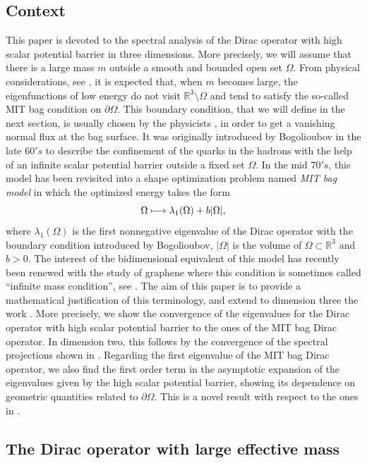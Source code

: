 \documentclass[10pt]{amsart}
\newcommand\mto{\mathchoice{\longmapsto}{\mapsto}{\mapsto}{\mapsto}}
\theoremstyle{plain}
\theoremstyle{definition}
\newcommand{\RR}{\mathbb{R}}
\begin{document}
\subsection{Context}
This paper is devoted to the spectral analysis of the Dirac operator with high scalar potential barrier in three dimensions. More precisely, we will assume that there is a large mass $m$ outside a smooth and bounded open set $\Omega$. From physical considerations, see \cite{bogoliubov1987,MIT061974}, it is expected that, when $m$ becomes large, the eigenfunctions of low energy do not visit $\RR^3\setminus\Omega$ and tend to satisfy the so-called MIT bag condition on $\partial\Omega$. This boundary condition, that we will define in the next section, is usually chosen by the physicists \cite{johnson,MIT061974,PhysRevD.12.2060}, in order to get a vanishing normal flux at the bag surface. It was originally introduced by Bogolioubov in the late $60's$ \cite{bogoliubov1987} to describe the confinement of the quarks in the hadrons with the help of an infinite scalar potential barrier outside a fixed set $\Omega$. In the mid $70's$, this model has been revisited into a shape optimization problem named \emph{MIT bag model} \cite{johnson,MIT061974,PhysRevD.12.2060} in which the optimized energy takes the form
\[
\Omega\mto \lambda_1(\Omega) + b|\Omega|,
\]
where $\lambda_1(\Omega)$ is the first nonnegative eigenvalue of the Dirac operator with the boundary condition introduced by Bogolioubov, $|\Omega|$ is the volume of $\Omega\subset\RR^3$ and $b>0$.
The interest of the bidimensional equivalent of this model has recently been renewed with the study of graphene where this condition is sometimes called \enquote{infinite mass condition}, see \cite{PhysRevB.77.085423,MR901725}. The aim of this paper is to provide a mathematical justification of this terminology, and extend to dimension three the work \cite{stockmeyer2016infinite}.
More precisely, we show the convergence of the eigenvalues for the Dirac operator with high scalar potential barrier to the ones of the MIT bag Dirac operator. In dimension two, this follows by the convergence of the spectral projections shown in \cite{stockmeyer2016infinite}. Regarding the first eigenvalue of the MIT bag Dirac operator, we also find the first order term in the asymptotic expansion of the eigenvalues given by the high scalar potential barrier, showing its dependence on geometric quantities related to $\partial\Omega$. This is a novel result with respect to the ones in \cite{stockmeyer2016infinite}.

\subsection{The Dirac operator with large effective mass}
\end{document}
